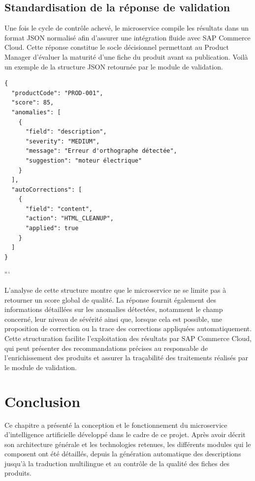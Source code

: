 \subsection{Standardisation de la réponse de validation}

Une fois le cycle de contrôle achevé, le microservice compile les résultats dans un format JSON normalisé afin d'assurer une intégration fluide avec SAP Commerce Cloud. Cette réponse constitue le socle décisionnel permettant au Product Manager d'évaluer la maturité d'une fiche du produit avant sa publication. 
Voilà un exemple de la structure JSON retournée par le module de validation.

\begin{tcolorbox}[
    colback=white,
    colframe=black,
    boxrule=0.8pt,
    arc=2mm,
    title=Exemple de réponse JSON du module de validation,
    fonttitle=\bfseries
]
\begin{verbatim}
{
  "productCode": "PROD-001",
  "score": 85,
  "anomalies": [
    {
      "field": "description",
      "severity": "MEDIUM",
      "message": "Erreur d'orthographe détectée",
      "suggestion": "moteur électrique"
    }
  ],
  "autoCorrections": [
    {
      "field": "content",
      "action": "HTML_CLEANUP",
      "applied": true
    }
  ]
}
\end{verbatim}
\end{tcolorbox}
```


L'analyse de cette structure montre que le microservice ne se limite pas à retourner un score global de qualité. La réponse fournit également des informations détaillées sur les anomalies détectées, notamment le champ concerné, leur niveau de sévérité ainsi que, lorsque cela est possible, une proposition de correction ou la trace des corrections appliquées automatiquement. Cette structuration facilite l'exploitation des résultats par SAP Commerce Cloud, qui peut présenter des recommandations précises au responsable de l'enrichissement des produits et assurer la traçabilité des traitements réalisés par le module de validation.

\section{Conclusion}

Ce chapitre a présenté la conception et le fonctionnement du microservice d'intelligence artificielle développé dans le cadre de ce projet. Après avoir décrit son architecture générale et les technologies retenues, les différents modules qui le composent ont été détaillés, depuis la génération automatique des descriptions jusqu'à la traduction multilingue et au contrôle de la qualité des fiches des produits.

